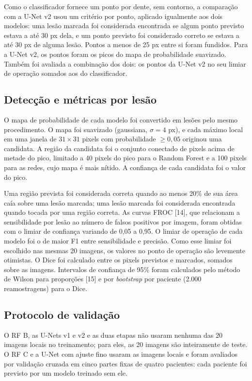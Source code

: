 \documentclass[twocolumn]{article}
\begin{document}
Como o classificador fornece um ponto por dente, sem contorno, a comparação com a U-Net v2 usou um critério por ponto, aplicado igualmente aos dois modelos: uma lesão marcada foi considerada encontrada se algum ponto previsto estava a até 30 px dela, e um ponto previsto foi considerado correto se estava a até 30 px de alguma lesão. Pontos a menos de 25 px entre si foram fundidos. Para a U-Net v2, os pontos foram os picos do mapa de probabilidade suavizado. Também foi avaliada a combinação dos dois: os pontos da U-Net v2 no seu limiar de operação somados aos do classificador.

\subsection{Detecção e métricas por lesão}

O mapa de probabilidade de cada modelo foi convertido em lesões pelo mesmo procedimento. O mapa foi suavizado (gaussiana, $\sigma = 4$ px), e cada máximo local em uma janela de $31 \times 31$ pixels com probabilidade $\geq 0{,}05$ originou uma candidata. A região da candidata foi o conjunto conectado de pixels acima de metade do pico, limitado a 40 pixels do pico para o Random Forest e a 100 pixels para as redes, cujo mapa é mais nítido. A confiança de cada candidata foi o valor do pico.

Uma região prevista foi considerada correta quando ao menos 20\% de sua área caía sobre uma lesão marcada; uma lesão marcada foi considerada encontrada quando tocada por uma região correta. As curvas FROC [14], que relacionam a sensibilidade por lesão ao número de falsos positivos por imagem, foram obtidas com o limiar de confiança variando de 0,05 a 0,95. O limiar de operação de cada modelo foi o de maior F1 entre sensibilidade e precisão. Como esse limiar foi escolhido nas mesmas 20 imagens, os valores no ponto de operação são levemente otimistas. O Dice foi calculado entre os pixels previstos e marcados, somados sobre as imagens. Intervalos de confiança de 95\% foram calculados pelo método de Wilson para proporções [15] e por \textit{bootstrap} por paciente (2.000 reamostragens) para o Dice.

\subsection{Protocolo de validação}

O RF B, as U-Nets v1 e v2 e as duas etapas não usaram nenhuma das 20 imagens locais no treinamento; para eles, as 20 imagens são inteiramente de teste. O RF C e a U-Net com ajuste fino usaram as imagens locais e foram avaliados por validação cruzada em cinco partes fixas de quatro pacientes: cada paciente foi previsto por um modelo treinado sem ele.
\end{document}
